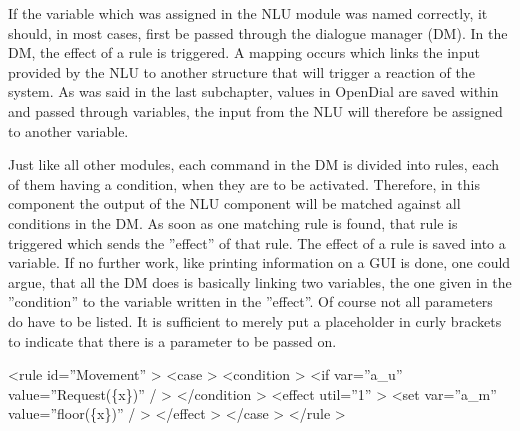 \documentclass[a4paper, 12pt]{article}
\begin{document}
If the variable which was assigned in the NLU module was named correctly, it should, in most cases, first be passed through the dialogue manager (DM).
In the DM, the effect of a rule is triggered. A mapping occurs which links the input provided by the NLU to another structure that will trigger a reaction of the system.
As was said in the last subchapter, values in OpenDial are saved within and passed through variables, the input from the NLU will therefore be assigned to another variable. \newline

Just like all other modules, each command in the DM is divided into rules, each of them having a condition, when they are to be activated. 
Therefore, in this component the output of the NLU component will be matched against all conditions in the DM. 
   As soon as one matching rule is found, that rule is triggered which sends the ”effect” of that rule.
   The effect of a rule is saved into a variable.
   If no further work, like printing information on a GUI is done, one could argue, that all the DM does is basically linking two variables, the one given in the ”condition” to the variable written in the ”effect”.
   Of course not all parameters do have to be listed.
   It is sufficient to merely put a placeholder in curly brackets to indicate that there is a parameter to be passed on. \newline


   \textless rule id=”Movement” \textgreater \newline
    \indent \indent \textless case \textgreater \newline
    \indent \indent \indent \textless condition \textgreater \newline
    \indent \indent \indent \indent \textless if var=”a\_u” value=”Request(\{x\})” / \textgreater \newline
     \indent \indent \indent \textless /condition \textgreater \newline
      \indent \indent \indent \textless effect util=”1” \textgreater \newline 
       \indent \indent \indent \indent \textless set var=”a\_m” value=”floor(\{x\})” / \textgreater \newline
        \indent \indent \indent \textless /effect \textgreater \newline
        \indent \indent \textless /case \textgreater \newline
        \indent \textless /rule \textgreater \newline
\end{document}
